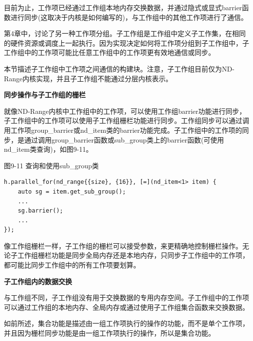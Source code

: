 目前为止，工作项已经通过工作组本地内存交换数据，并通过隐式或显式barrier函数进行同步(这取决于内核是如何编写的)，与工作组中的其他工作项进行了通信。\par

第4章中，讨论了另一种工作项分组。子工作组是工作组中定义子工作集，在相同的硬件资源或调度上一起执行。因为实现决定如何将工作项分组到子工作组中，子工作组中的工作项可能比任意工作组中的工作项更有效地通信或同步。\par

本节描述子工作组中工作项之间通信的构建块。注意，子工作组目前仅为ND-Range内核实现，并且子工作组不能通过分层内核表示。\par

\hspace*{\fill} \par %
\textbf{同步操作与子工作组的栅栏}

就像ND-Range内核中工作组中的工作项，可以使用工作组barrier功能进行同步，子工作组中的工作项可以使用子工作组栅栏功能进行同步。工作组同步可以通过调用工作项group\_barrier或nd\_item类的barrier功能完成。子工作组中的工作项的同步，是通过调用group\_barrier函数或sub\_group类上的barrier函数(可使用nd\_item类查询)，如图9-11。\par

\hspace*{\fill} \par %
图9-11 查询和使用sub\_group类
\begin{lstlisting}[caption={}]
h.parallel_for(nd_range{{size}, {16}}, [=](nd_item<1> item) {
	auto sg = item.get_sub_group();
	...
	sg.barrier();
	...
});
\end{lstlisting}

像工作组栅栏一样，子工作组的栅栏可以接受参数，来更精确地控制栅栏操作。无论子工作组栅栏功能是同步全局内存还是本地内存，只同步子工作组中的工作项，都可能比同步工作组中的所有工作项要划算。\par

\hspace*{\fill} \par %
\textbf{子工作组内的数据交换}

与工作组不同，子工作组没有用于交换数据的专用内存空间。子工作组中的工作项可以通过工作组的本地内存、全局内存或通过使用子工作组集合函数来交换数据。\par

如前所述，集合功能是描述由一组工作项执行的操作的功能，而不是单个工作项，并且因为栅栏同步功能是由一组工作项执行的操作，所以是集合功能。\par

